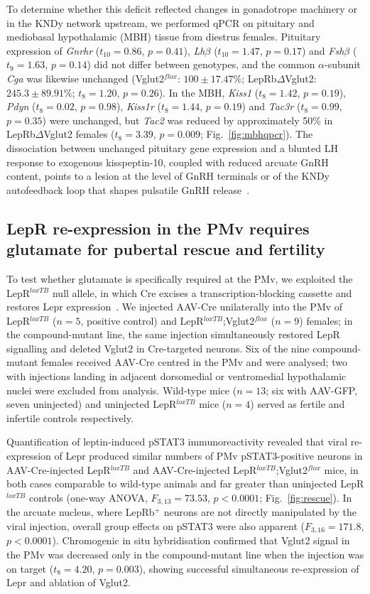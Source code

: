 \documentclass[11pt]{article}
\begin{document}
To determine whether this deficit reflected changes in gonadotrope machinery or in the KNDy network upstream, we performed qPCR on pituitary and mediobasal hypothalamic (MBH) tissue from diestrus females. Pituitary expression of \textit{Gnrhr} ($t_{10}=0.86$, $p=0.41$), \textit{Lh$\beta$} ($t_{10}=1.47$, $p=0.17$) and \textit{Fsh$\beta$} ($t_{9}=1.63$, $p=0.14$) did not differ between genotypes, and the common $\alpha$-subunit \textit{Cga} was likewise unchanged (Vglut2$^{flox}$: $100\pm17.47\%$; LepRb$\Delta$Vglut2: $245.3\pm89.91\%$; $t_{8}=1.20$, $p=0.26$). In the MBH, \textit{Kiss1} ($t_{8}=1.42$, $p=0.19$), \textit{Pdyn} ($t_{8}=0.02$, $p=0.98$), \textit{Kiss1r} ($t_{8}=1.44$, $p=0.19$) and \textit{Tac3r} ($t_{8}=0.99$, $p=0.35$) were unchanged, but \textit{Tac2} was reduced by approximately 50\% in LepRb$\Delta$Vglut2 females ($t_{8}=3.39$, $p=0.009$; Fig.~\ref{fig:mbhqpcr}). The dissociation between unchanged pituitary gene expression and a blunted LH response to exogenous kisspeptin-10, coupled with reduced arcuate GnRH content, points to a lesion at the level of GnRH terminals or of the KNDy autofeedback loop that shapes pulsatile GnRH release~\citep{navarro2011regulation,navarro2013interactions}.

\subsection{LepR re-expression in the PMv requires glutamate for pubertal rescue and fertility}
To test whether glutamate is specifically required at the PMv, we exploited the LepR$^{loxTB}$ null allele, in which Cre excises a transcription-blocking cassette and restores Lepr expression~\citep{berglund2012direct}. We injected AAV-Cre unilaterally into the PMv of LepR$^{loxTB}$ ($n=5$, positive control) and LepR$^{loxTB}$;Vglut2$^{flox}$ ($n=9$) females; in the compound-mutant line, the same injection simultaneously restored LepR signalling and deleted Vglut2 in Cre-targeted neurons. Six of the nine compound-mutant females received AAV-Cre centred in the PMv and were analysed; two with injections landing in adjacent dorsomedial or ventromedial hypothalamic nuclei were excluded from analysis. Wild-type mice ($n=13$; six with AAV-GFP, seven uninjected) and uninjected LepR$^{loxTB}$ mice ($n=4$) served as fertile and infertile controls respectively.

Quantification of leptin-induced pSTAT3 immunoreactivity revealed that viral re-expression of Lepr produced similar numbers of PMv pSTAT3-positive neurons in AAV-Cre-injected LepR$^{loxTB}$ and AAV-Cre-injected LepR$^{loxTB}$;Vglut2$^{flox}$ mice, in both cases comparable to wild-type animals and far greater than uninjected LepR$^{loxTB}$ controls (one-way ANOVA, $F_{3,13}=73.53$, $p<0.0001$; Fig.~\ref{fig:rescue}). In the arcuate nucleus, where LepRb$^+$ neurons are not directly manipulated by the viral injection, overall group effects on pSTAT3 were also apparent ($F_{3,16}=171.8$, $p<0.0001$). Chromogenic in situ hybridisation confirmed that Vglut2 signal in the PMv was decreased only in the compound-mutant line when the injection was on target ($t_{8}=4.20$, $p=0.003$), showing successful simultaneous re-expression of Lepr and ablation of Vglut2.
\end{document}
